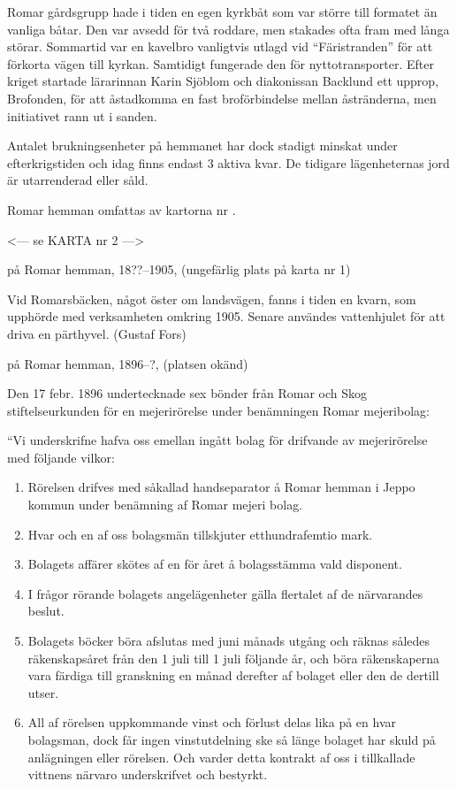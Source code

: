 
Romar gårdsgrupp hade i tiden en egen kyrkbåt som var större till formatet än vanliga båtar. Den var avsedd för två roddare, men stakades ofta fram med långa störar. Sommartid var en kavelbro vanligtvis utlagd vid ``Färistranden'' för att förkorta vägen till kyrkan. Samtidigt fungerade den för nyttotransporter. Efter kriget startade lärarinnan Karin Sjöblom och diakonissan Backlund ett upprop, Brofonden, för att åstadkomma en fast broförbindelse mellan åstränderna, men initiativet rann ut i sanden.

Antalet brukningsenheter på hemmanet har dock stadigt minskat under efterkrigstiden och idag finns endast 3 aktiva kvar. De tidigare lägenheternas jord är utarrenderad eller såld.



Romar hemman omfattas av kartorna nr .


<--- se KARTA nr 2 --->


%
 på Romar hemman, 18??--1905, (ungefärlig plats på karta nr 1)

Vid Romarsbäcken, något öster om landsvägen, fanns i tiden en kvarn, som upphörde med verksamheten omkring 1905. Senare användes vattenhjulet för att driva en pärthyvel. (Gustaf Fors)


%
 på Romar hemman, 1896--?, (platsen okänd)

Den 17 febr. 1896 undertecknade sex bönder från Romar och Skog stiftelseurkunden för en mejerirörelse under benämningen Romar mejeribolag:

``Vi underskrifne hafva oss emellan ingått bolag för drifvande av mejerirörelse med följande vilkor:
\begin{enumerate}
  \item Rörelsen drifves med såkallad handseparator å Romar hemman i Jeppo kommun under benämning af Romar mejeri bolag.
  \item Hvar och en af oss bolagsmän tillskjuter etthundrafemtio mark.
  \item Bolagets affärer skötes af en för året å bolagsstämma vald disponent.
  \item I frågor rörande bolagets angelägenheter gälla flertalet af de närvarandes beslut.
  \item Bolagets böcker böra afslutas med juni månads utgång och räknas således räkenskapsåret från den 1 juli till 1 juli följande år, och böra räkenskaperna vara färdiga till granskning en månad derefter af bolaget eller den de dertill utser.
  \item All af rörelsen uppkommande vinst och förlust delas lika på en hvar bolagsman, dock får ingen vinstutdelning ske så länge bolaget har skuld på anlägningen eller rörelsen. Och varder detta kontrakt af oss i tillkallade vittnens närvaro underskrifvet och bestyrkt.
\end{enumerate}

